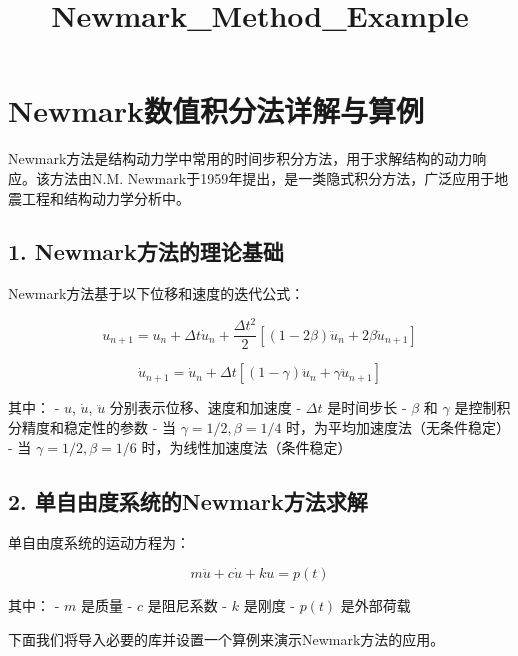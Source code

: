\documentclass[11pt]{article}
\title{Newmark\_Method\_Example}
\begin{document}
    
    \maketitle
    
    

    
    \section{Newmark数值积分法详解与算例}\label{newmarkux6570ux503cux79efux5206ux6cd5ux8be6ux89e3ux4e0eux7b97ux4f8b}

Newmark方法是结构动力学中常用的时间步积分方法，用于求解结构的动力响应。该方法由N.M.
Newmark于1959年提出，是一类隐式积分方法，广泛应用于地震工程和结构动力学分析中。

    \subsection{1.
Newmark方法的理论基础}\label{newmarkux65b9ux6cd5ux7684ux7406ux8bbaux57faux7840}

Newmark方法基于以下位移和速度的迭代公式：

\[u_{n+1} = u_n + \Delta t \dot{u}_n + \frac{\Delta t^2}{2}[(1-2\beta)\ddot{u}_n + 2\beta\ddot{u}_{n+1}]\]

\[\dot{u}_{n+1} = \dot{u}_n + \Delta t[(1-\gamma)\ddot{u}_n + \gamma\ddot{u}_{n+1}]\]

其中： - \(u\), \(\dot{u}\), \(\ddot{u}\) 分别表示位移、速度和加速度 -
\(\Delta t\) 是时间步长 - \(\beta\) 和 \(\gamma\)
是控制积分精度和稳定性的参数 - 当 \(\gamma = 1/2, \beta = 1/4\)
时，为平均加速度法（无条件稳定） - 当 \(\gamma = 1/2, \beta = 1/6\)
时，为线性加速度法（条件稳定）

    \subsection{2.
单自由度系统的Newmark方法求解}\label{ux5355ux81eaux7531ux5ea6ux7cfbux7edfux7684newmarkux65b9ux6cd5ux6c42ux89e3}

单自由度系统的运动方程为：

\[m\ddot{u} + c\dot{u} + ku = p(t)\]

其中： - \(m\) 是质量 - \(c\) 是阻尼系数 - \(k\) 是刚度 - \(p(t)\)
是外部荷载

下面我们将导入必要的库并设置一个算例来演示Newmark方法的应用。
\end{document}
